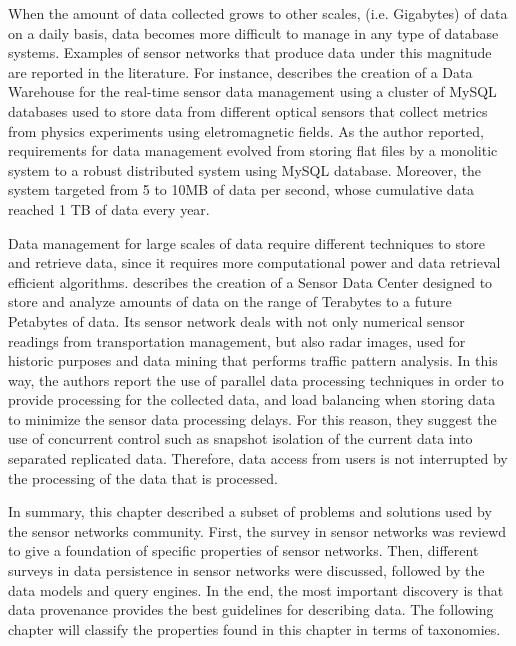 When the amount of data collected grows to other scales, (i.e. Gigabytes) of data
on a daily basis, data becomes more difficult to manage in any type of
database systems. Examples of sensor networks that produce data under this
magnitude are reported in the literature. For instance, 
\cite{sn-dataware-house} describes the creation of a Data Warehouse for the
real-time sensor data management using a cluster of MySQL databases used to
store data from different optical sensors that collect metrics
from physics experiments using eletromagnetic fields. As the author reported,
requirements for data management evolved from storing flat files by a
monolitic system to a robust distributed system using MySQL database.
Moreover, the system targeted from 5 to 10MB of data per second, whose
cumulative data reached 1 TB of data every year.

Data management for large scales of data require different techniques to store
and retrieve data, since it requires more computational power and data
retrieval efficient algorithms. \cite{sn-data-center-replication-load-balance} describes the creation of
a Sensor Data Center designed to store and analyze amounts of data on the range of
Terabytes to a future Petabytes of data. Its sensor network deals with not only
numerical sensor readings from transportation management, but also radar
images, used for historic purposes and data mining that performs traffic
pattern analysis. In this way, the authors report the use of parallel data
processing techniques in order to provide processing for the collected
data, and load balancing when storing data to minimize the sensor data
processing delays. For this reason, they suggest the use of concurrent control
such as snapshot isolation of the current data into separated replicated data.
Therefore, data access from users is not interrupted by the processing of
the data that is processed.

In summary, this chapter described a subset of problems and solutions used by
the sensor networks community. First, the survey in sensor networks was
reviewd to give a foundation of specific properties of sensor networks. Then,
different surveys in data persistence in sensor networks were discussed,
followed by the data models and query engines. In the end, the most important 
discovery is that data provenance provides the best guidelines for describing 
data. The following chapter will classify the properties found in this chapter
in terms of taxonomies.